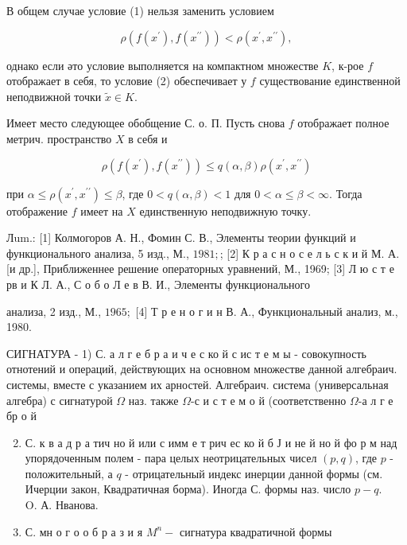 \documentclass[10pt]{article}
\begin{document}
В общем случае условие (1) нельзя заменить условием



\[

\rho\left(f\left(x^{\prime}\right), f\left(x^{\prime \prime}\right)\right)<\rho\left(x^{\prime}, x^{\prime \prime}\right),

\]



однако если әто условие выполняется на компактном множестве $K$, к-рое $f$ отображает в себя, то условие (2) обеспечивает у $f$ существование единственной неподвижной точки $\tilde{x} \in K$.



Имеет место следующее обобщение С. о. П. Пусть снова $f$ отображает полное метрич. пространство $X$ в себя и



\[

\rho\left(f\left(x^{\prime}\right), f\left(x^{\prime \prime}\right)\right) \leqslant q(\alpha, \beta) \rho\left(x^{\prime}, x^{\prime \prime}\right)

\]



при $\alpha \leqslant \rho\left(x^{\prime}, x^{\prime \prime}\right) \leqslant \beta$, где $0<q(\alpha, \beta)<1$ для $0<\alpha \leqslant \beta<\infty$. Тогда отображение $f$ имеет на $X$ единственную неподвижную точку.



Лum.: [1] Колмогоров А. Н., Фомин С. В., Элементы теории функций и функционального анализа, 5 изд., М., $1981 ;$; [2] К р а с н о с е л ь с к и й М. А. [и др.], Приближеннее решение операторных уравнений, М., 1969; [3] Л ю с т е рв и К Л. А., С о б о Л е в В. И., Элементы функционального

анализа, 2 изд., М., $1965 ;$ [4] Т р е н о г и н В. А., Функциональный анализ, м., 1980.



СИГНАТУРА - 1) С. а л г е б р а и ч е с ко й с ис т е м ы - совокупность отнотений и операций, действующих на основном множестве данной алгебраич. системы, вместе с указанием их арностей. Алгебраич. система (универсальная алгебра) с сигнатурой $\Omega$ наз. также $\Omega$-с и с т е м о й (соответственно $\Omega$-а л г е бр о й



\begin{enumerate}

  \setcounter{enumi}{1}

  \item С. к в а д р а тич но й или с имм е т рич ес ко й б Ј и не й но й фо р м над упорядоченным полем - пара целых неотрицательных чисел $(p, q)$, где $p$ - положительный, а $q$ - отрицательный индекс инерции данной формы (см. Ичерции закон, Квадратичная борма). Иногда С. формы наз. число $p-q$. $\quad$ O. А. Нванова.



  \item С. мн о г о о б р а з и я $M^{n}-$ сигнатура квадратичной формы



\end{enumerate}
\end{document}
